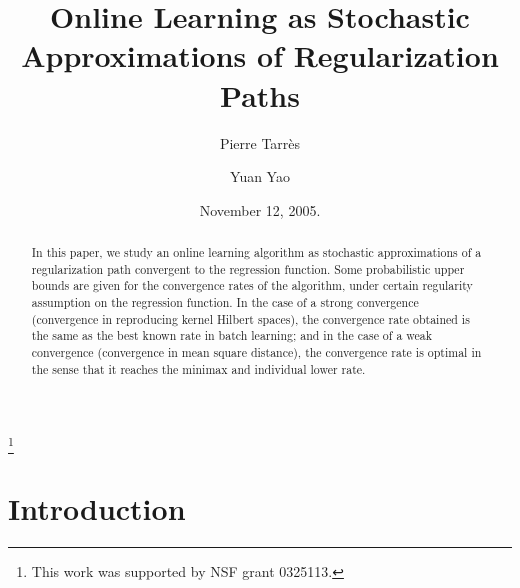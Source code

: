 \documentclass[twoside,11pt]{amsart}
\theoremstyle{theorem}
\theoremstyle{definition}
\theoremstyle{remark}
\begin{document}
\title{Online Learning as Stochastic Approximations of Regularization Paths}
\thanks{This work was supported by NSF grant 0325113.}

\author{Pierre Tarr\`es}
\address{Pierre Tarr\`es, Mathematical Institute, University of Oxford, 24-29 St Giles', Oxford OX1 3LB,  U.K.}

\author{Yuan Yao}
\address{Yuan Yao, Department of Mathematics, University of California at Berkeley, Berkeley, CA 94720.}


\date{November 12, 2005.}


\maketitle

\begin{abstract}
In this paper, we study an online learning algorithm as stochastic approximations of a regularization path convergent to the regression function. 
Some probabilistic upper bounds are given for the convergence rates of the algorithm, under certain regularity assumption on the regression function. 
In the case of a strong convergence (convergence in reproducing kernel Hilbert spaces), 
the convergence rate obtained is the same as the best known rate in batch learning; and in the case of a weak convergence (convergence in mean square distance),
the convergence rate is optimal in the sense that it reaches the minimax and individual lower rate. 
\end{abstract}

\bigskip





\section{Introduction}

\end{document}
